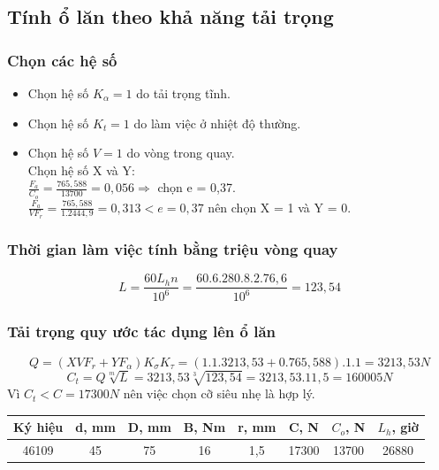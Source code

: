 \subsection{Tính ổ lăn theo khả năng tải trọng}
\subsubsection*{Chọn các hệ số}
\begin{itemize}
    \item Chọn hệ số $K_\alpha = 1$ do tải trọng tĩnh.
    \item Chọn hệ số $K_t = 1$ do làm việc ở nhiệt độ thường.
    \item Chọn hệ số $V = 1$ do vòng trong quay.\\
    Chọn hệ số X và Y: \\
    $\frac{F_a}{C_o} = \frac{765,588}{13700} = 0,056 \Rightarrow$ chọn e = 0,37.\\
    $\frac{F_a}{VF_r} = \frac{765,588}{1.2444,9} = 0,313 < e = 0,37$ nên chọn X = 1 và Y = 0.
\end{itemize}
\subsubsection*{Thời gian làm việc tính bằng triệu vòng quay}
\[
    L = \frac{60L_hn}{10^6} = \frac{60.6.280.8.2.76,6}{10^6} = 123,54 
\]
\subsubsection*{Tải trọng quy ước tác dụng lên ổ lăn}
\[
    Q = (XVF_r+YF_\alpha)K_\sigma K_\tau = (1.1.3213,53 + 0.765,588).1.1 = 3213,53N
\]
\[
    C_t = Q\sqrt[m]{L} =3213,53\sqrt[3]{123,54} = 3213,53.11,5 = 160005N
\]
Vì $C_t < C = 17300N$ nên việc chọn cỡ siêu nhẹ là hợp lý.
\begin{center}
\begin{tabular}{|c|c|c|c|c|c|c|c|}
    \hline
       \textbf{Ký hiệu} & \textbf{d, mm} & \textbf{D, mm} & \textbf{B, Nm} & \textbf{r, mm} & \textbf{C, N} & \textbf{$C_o$, N} & \textbf{$L_h$, giờ} \\
    \hline
    46109 & 45 & 75 & 16 & 1,5 & 17300 & 13700 & 26880 \\
    \hline
\end{tabular}
\end{center}
\cleardoublepage